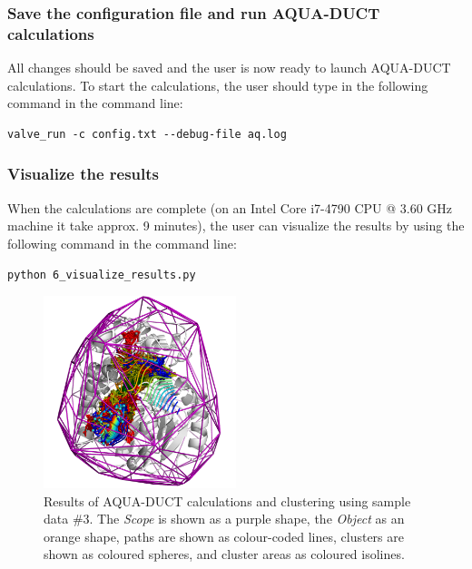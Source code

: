 \documentclass[9pt,tutorial, pubversion]{livecoms}
\begin{document}
\subsubsection{Save the configuration file and run AQUA-DUCT calculations}
All changes should be saved and the user is now ready to launch AQUA-DUCT calculations. To start the calculations, the user should type in the following command in the command line:
\begin{lstlisting}
valve_run -c config.txt --debug-file aq.log 
\end{lstlisting}

\subsubsection{Visualize the results}
When the calculations are complete (on an Intel Core i7-4790 CPU @ 3.60 GHz machine it take approx. 9 minutes), the user can visualize the results by using the following command in the command line:
\begin{lstlisting}
python 6_visualize_results.py
\end{lstlisting}

\begin{figure}[ht!]
\centering
\includegraphics[width=0.5\textwidth]{Tut6.1.png}
\caption{Results of AQUA-DUCT calculations and clustering using sample data \#3. The \textit{Scope} is shown as a purple shape, the \textit{Object} as an orange shape, paths are shown as colour-coded lines, clusters are shown as coloured spheres, and cluster areas as coloured isolines.}
\label{Tut6.1}
\end{figure}
\end{document}
